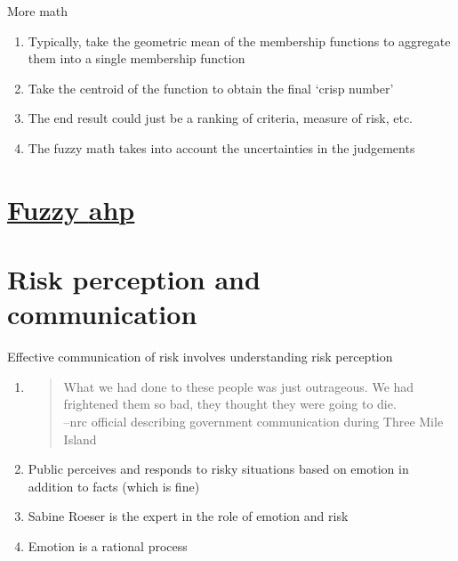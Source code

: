 \documentclass[aspectratio=1610,pdftex,dvipsnames,compress,xcolor={dvipsnames}]{beamer}
\newcommand{\acs}{\acrshort} %
\begin{document}
\begin{frame}{More math}
    \begin{enumerate}[series=outerlist,topsep=0pt,itemsep=21pt,leftmargin=*,label=(\arabic*)]
        \item[]Typically, take the geometric mean of the membership functions to aggregate them into a single membership function
        \item[]Take the centroid of the function to obtain the final `crisp number'
        \item[]The end result could just be a ranking of criteria, measure of risk, etc.
        \item[]The fuzzy math takes into account the uncertainties in the judgements
    \end{enumerate}
\end{frame}


\section{\href{https://www.sciencedirect.com/science/article/pii/S0149197021004352}{Fuzzy \acs{ahp}}}


\section{Risk perception and communication}


\addtocounter{framenumber}{-2}
\begin{frame}{Effective communication of risk involves understanding risk perception}
    \begin{enumerate}[series=outerlist,topsep=0pt,itemsep=21pt,leftmargin=*,label=(\arabic*)]
        \item[]
            \begin{quote}
                What we had done to these people was just outrageous. We had frightened them so bad, they thought they were going to die. \\
                --\acs{nrc} official describing government communication during Three Mile Island
            \end{quote}
        \item[]Public perceives and responds to risky situations based on emotion in addition to facts (which is fine)
        \item[]Sabine Roeser is the expert in the role of emotion and risk  
        \item[]Emotion is a rational process
    \end{enumerate}
\end{frame}
\end{document}
